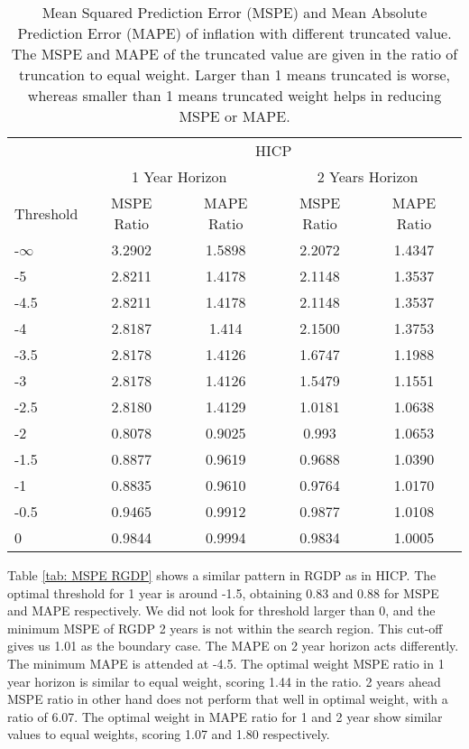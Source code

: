 \documentclass[11pt]{article}
\begin{document}
\begin{table}[!h]
	\centering
	\caption{Mean Squared Prediction Error (MSPE) and Mean Absolute Prediction Error (MAPE) of inflation with different truncated value. The MSPE and MAPE of the truncated value are given in the ratio of truncation to equal weight. Larger than 1 means truncated is worse, whereas smaller than 1 means truncated weight helps in reducing MSPE or MAPE.}
	\label{tab: MSPE HICP}
	\begin{tabular}{lcccc}
		\hline
		&                        \multicolumn{4}{c}{HICP}                         \\
		\cmidrule(lr){2-5}                              & \multicolumn{2}{c}{1 Year Horizon} & \multicolumn{2}{c}{2 Years Horizon} \\
		\cmidrule(lr){2-3} \cmidrule(lr){4-5}
		Threshold & MSPE Ratio &    MAPE Ratio    & MSPE Ratio &    MAPE Ratio    \\ \hline
		-$\infty$ & 3.2902 & 1.5898 & 2.2072 & 1.4347\\ 
		-5 & 2.8211 & 1.4178 & 2.1148 & 1.3537\\ 
		-4.5 & 2.8211 & 1.4178 & 2.1148 & 1.3537\\ 
		-4 & 2.8187 & 1.414 & 2.1500 & 1.3753\\ 
		-3.5 & 2.8178 & 1.4126 & 1.6747 & 1.1988\\ 
		-3 & 2.8178 & 1.4126 & 1.5479 & 1.1551\\ 
		-2.5 & 2.8180 & 1.4129 & 1.0181 & 1.0638\\ 
		-2 & 0.8078 & 0.9025 & 0.993 & 1.0653\\ 
		-1.5 & 0.8877 & 0.9619 & 0.9688 & 1.0390\\ 
		-1 & 0.8835 & 0.9610 & 0.9764 & 1.0170\\ 
		-0.5 & 0.9465 & 0.9912 & 0.9877 & 1.0108\\ 
		0 & 0.9844 & 0.9994 & 0.9834 & 1.0005\\ 		 \hline
	\end{tabular}
\end{table}

Table \ref{tab: MSPE RGDP} shows a similar pattern in RGDP as in HICP. The optimal threshold for 1 year is around -1.5, obtaining 0.83 and 0.88 for MSPE and MAPE respectively. We did not look for threshold larger than 0, and the minimum MSPE of RGDP 2 years is not within the search region. This cut-off gives us 1.01 as the boundary case. The MAPE on 2 year horizon acts differently. The minimum MAPE is attended at -4.5. The optimal weight MSPE ratio in 1 year horizon is similar to equal weight, scoring 1.44 in the ratio. 2 years ahead MSPE ratio in other hand does not perform that well in optimal weight, with a ratio of 6.07. The optimal weight in MAPE ratio for 1 and 2 year show similar values to equal weights, scoring 1.07 and 1.80 respectively.
\end{document}
